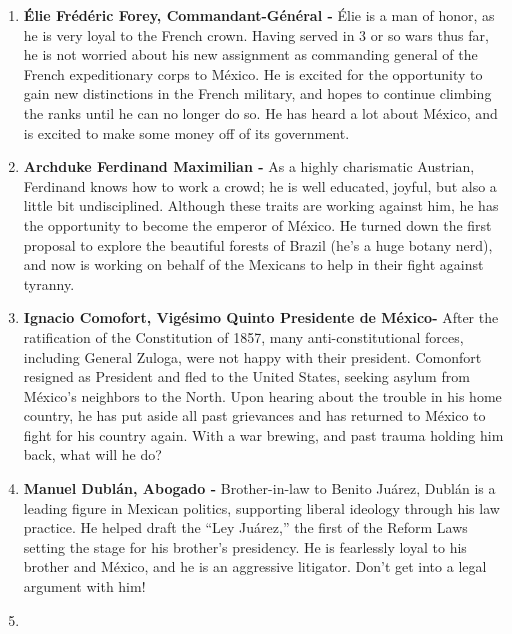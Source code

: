 \documentclass[10pt, letterpaper]{article}
\begin{document}
\begin{enumerate}
\item
  
  \textbf{Élie Frédéric Forey, Commandant-Général -} Élie is a man of
  honor, as he is very loyal to the French crown. Having served in 3 or
  so wars thus far, he is not worried about his new assignment as
  commanding general of the French expeditionary corps to México. He is
  excited for the opportunity to gain new distinctions in the French
  military, and hopes to continue climbing the ranks until he can no
  longer do so. He has heard a lot about México, and is excited to make
  some money off of its government.
  
\item
  
  \textbf{Archduke Ferdinand Maximilian -} As a highly charismatic
  Austrian, Ferdinand knows how to work a crowd; he is well educated,
  joyful, but also a little bit undisciplined. Although these traits are
  working against him, he has the opportunity to become the emperor of
  México. He turned down the first proposal to explore the beautiful
  forests of Brazil (he's a huge botany nerd), and now is working on
  behalf of the Mexicans to help in their fight against tyranny.
  
\item
  
  \textbf{Ignacio Comofort, Vigésimo Quinto Presidente de México-} After
  the ratification of the Constitution of 1857, many anti-constitutional
  forces, including General Zuloga, were not happy with their president.
  Comonfort resigned as President and fled to the United States, seeking
  asylum from México's neighbors to the North. Upon hearing about the
  trouble in his home country, he has put aside all past grievances and
  has returned to México to fight for his country again. With a war
  brewing, and past trauma holding him back, what will he do?
  
\item
  
  \textbf{Manuel Dublán, Abogado -} Brother-in-law to Benito Juárez,
  Dublán is a leading figure in Mexican politics, supporting liberal
  ideology through his law practice. He helped draft the ``Ley Juárez,''
  the first of the Reform Laws setting the stage for his brother's
  presidency. He is fearlessly loyal to his brother and México, and he
  is an aggressive litigator. Don't get into a legal argument with him!
  
\item
  

\end{enumerate}
\end{document}
